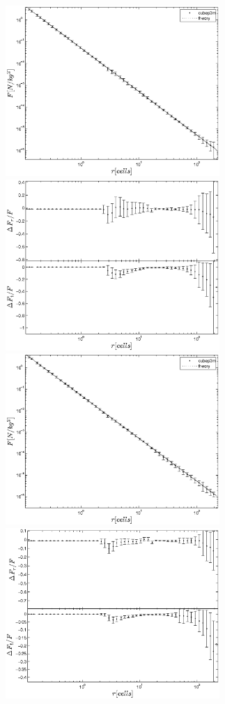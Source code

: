  \begin{figure}%
  \begin{center}
    \includegraphics[width=3.2in]{graphs/densityForce_ppext=2_rebin_new-1.eps}
    \includegraphics[width=3.2in]{graphs/densityForce_fracErr_ppext=2_rebin_new-1.eps}
     \includegraphics[width=3.2in]{graphs/densityForce_ppext=2_rebin_N10_new-1.eps}
    \includegraphics[width=3.2in]{graphs/densityForce_fracErr_ppext=2_rebin_N10_new-1.eps}

\end{center}
\end{figure}
